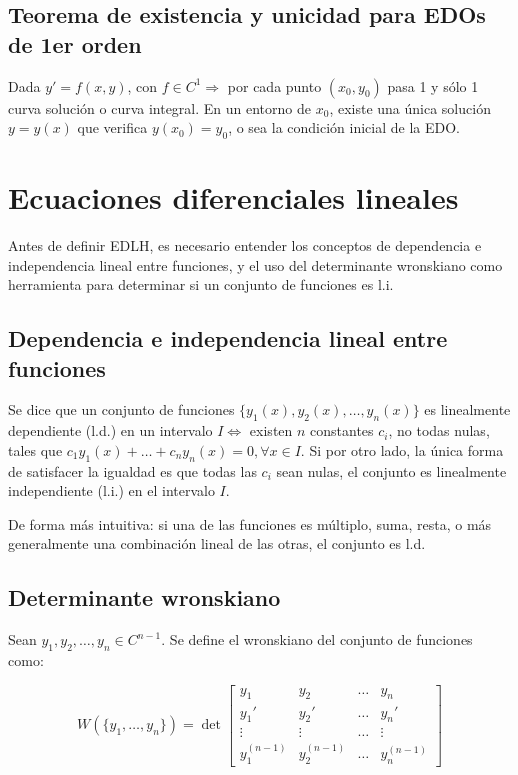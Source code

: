 \documentclass{article}
\begin{document}
\subsection{Teorema de existencia y unicidad para EDOs de 1er orden}

Dada $y' = f(x,y)$, con $f \in C^1 \Rightarrow$ por cada punto $(x_0, y_0)$ pasa 1 y sólo 1 curva solución o curva integral. En un entorno de $x_0$, existe una única solución $y = y(x)$ que verifica $y(x_0) = y_0$, o sea la condición inicial de la EDO.

\section{Ecuaciones diferenciales lineales}

Antes de definir EDLH, es necesario entender los conceptos de dependencia e independencia lineal entre funciones, y el uso del determinante wronskiano como herramienta para determinar si un conjunto de funciones es l.i.

\subsection{Dependencia e independencia lineal entre funciones}

Se dice que un conjunto de funciones $\{y_1(x), y_2(x), \ldots, y_n(x) \}$ es linealmente dependiente (l.d.) en un intervalo $I \Leftrightarrow$ existen $n$ constantes $c_i$, no todas nulas, tales que $c_1 y_1(x) + \ldots + c_n y_n(x) = 0, \forall x \in I$. Si por otro lado, la única forma de satisfacer la igualdad es que todas las $c_i$ sean nulas, el conjunto es linealmente independiente (l.i.) en el intervalo $I$.

De forma más intuitiva: si una de las funciones es múltiplo, suma, resta, o más generalmente una combinación lineal de las otras, el conjunto es l.d.

\subsection{Determinante wronskiano}

Sean $y_1, y_2, \ldots, y_n \in C^{n-1}$. Se define el wronskiano del conjunto de funciones como:

\begin{equation}
W(\{y_1, \ldots, y_n\}) = \det
\begin{bmatrix}
y_1 & y_2 & \ldots & y_n \\
y_1' & y_2' & \ldots & y_n' \\
\vdots & \vdots & \ldots & \vdots \\
y_1^{(n-1)} & y_2^{(n-1)} & \ldots & y_n^{(n-1)}
\end{bmatrix}
\end{equation}
\end{document}
